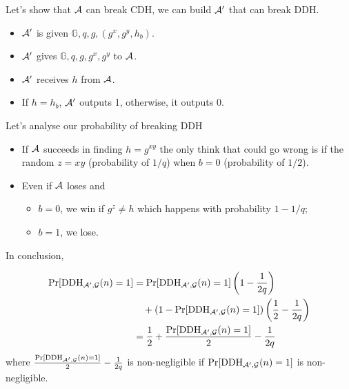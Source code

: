 \begin{solution}
  Let's show that $\mathcal{A}$ can break CDH, we can build $\mathcal{A}'$ that can break DDH.
  \begin{itemize}
    \item $\mathcal{A}'$ is given $\mathbb{G}, q, g, (g^x, g^y, h_b)$.
    \item $\mathcal{A}'$ gives $\mathbb{G}, q, g, g^x, g^y$ to $\mathcal{A}$.
    \item $\mathcal{A}'$ receives $h$ from $\mathcal{A}$.
    \item If $h = h_b$, $\mathcal{A}'$ outputs 1, otherwise, it outputs 0.
  \end{itemize}
  Let's analyse our probability of breaking DDH
  \begin{itemize}
    \item
      If $\mathcal{A}$ succeeds in finding $h = g^{xy}$ the only think that could go wrong
      is if the random $z = xy$ (probability of $1/q$) when $b = 0$ (probability of $1/2$).
    \item
      Even if $\mathcal{A}$ loses and
      \begin{itemize}
        \item $b = 0$, we win if $g^z \neq h$ which happens with probability $1-1/q$;
        \item $b = 1$, we lose.
      \end{itemize}
  \end{itemize}
  In conclusion,

  \begin{align*}
    \Pr[\operatorname{DDH}_{\mathcal{A}',\mathcal{G}}(n) = 1]
    & = \Pr[\operatorname{DDH}_{\mathcal{A}',\mathcal{G}}(n) = 1]\left(1 - \frac{1}{2q}\right)\\
    & \quad + (1 - \Pr[\operatorname{DDH}_{\mathcal{A}',\mathcal{G}}(n) = 1])\left(\frac{1}{2}-\frac{1}{2q}\right)\\
    & = \frac{1}{2} + \frac{\Pr[\operatorname{DDH}_{\mathcal{A}',\mathcal{G}}(n) = 1]}{2} - \frac{1}{2q}
  \end{align*}
  where $\frac{\Pr[\operatorname{DDH}_{\mathcal{A}',\mathcal{G}}(n) = 1]}{2} - \frac{1}{2q}$ is non-negligible if $\Pr[\operatorname{DDH}_{\mathcal{A}',\mathcal{G}}(n) = 1]$
  is non-negligible.
\end{solution}
